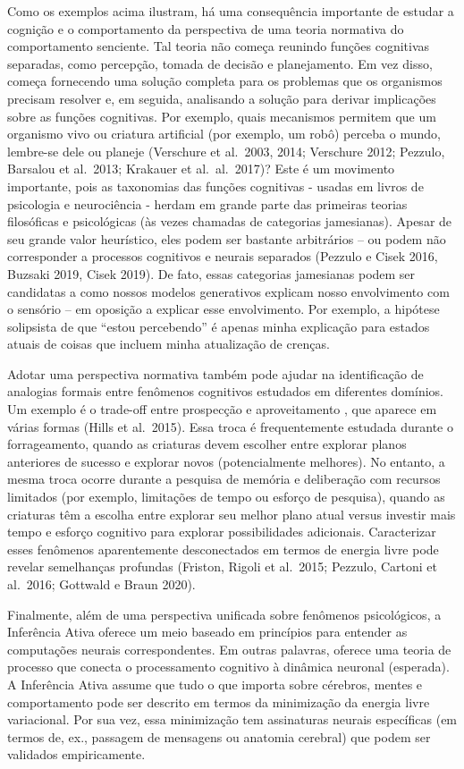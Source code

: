 \documentclass[
  12pt,
]{book}
\begin{document}
Como os exemplos acima ilustram, há uma consequência importante de estudar a cognição e o comportamento da perspectiva de uma teoria normativa do comportamento senciente. Tal teoria não começa reunindo funções cognitivas separadas, como percepção, tomada de decisão e planejamento. Em vez disso, começa fornecendo uma solução completa para os problemas que os organismos precisam resolver e, em seguida, analisando a solução para derivar implicações sobre as funções cognitivas. Por exemplo, quais mecanismos permitem que um organismo vivo ou criatura artificial (por exemplo, um robô) perceba o mundo, lembre-se dele ou planeje (Verschure et al.~2003, 2014; Verschure 2012; Pezzulo, Barsalou et al.~2013; Krakauer et al.~al.~2017)? Este é um movimento importante, pois as taxonomias das funções cognitivas - usadas em livros de psicologia e neurociência - herdam em grande parte das primeiras teorias filosóficas e psicológicas (às vezes chamadas de categorias jamesianas). Apesar de seu grande valor heurístico, eles podem ser bastante arbitrários -- ou podem não corresponder a processos cognitivos e neurais separados (Pezzulo e Cisek 2016, Buzsaki 2019, Cisek 2019). De fato, essas categorias jamesianas podem ser candidatas a como nossos modelos generativos explicam nosso envolvimento com o sensório -- em oposição a explicar esse envolvimento. Por exemplo, a hipótese solipsista de que ``estou percebendo'' é apenas minha explicação para estados atuais de coisas que incluem minha atualização de crenças.

Adotar uma perspectiva normativa também pode ajudar na identificação de analogias formais entre fenômenos cognitivos estudados em diferentes domínios. Um exemplo é o trade-off entre prospecção e aproveitamento , que aparece em várias formas (Hills et al.~2015). Essa troca é frequentemente estudada durante o forrageamento, quando as criaturas devem escolher entre explorar planos anteriores de sucesso e explorar novos (potencialmente melhores). No entanto, a mesma troca ocorre durante a pesquisa de memória e deliberação com recursos limitados (por exemplo, limitações de tempo ou esforço de pesquisa), quando as criaturas têm a escolha entre explorar seu melhor plano atual versus investir mais tempo e esforço cognitivo para explorar possibilidades adicionais. Caracterizar esses fenômenos aparentemente desconectados em termos de energia livre pode revelar semelhanças profundas (Friston, Rigoli et al.~2015; Pezzulo, Cartoni et al.~2016; Gottwald e Braun 2020).

Finalmente, além de uma perspectiva unificada sobre fenômenos psicológicos, a Inferência Ativa oferece um meio baseado em princípios para entender as computações neurais correspondentes. Em outras palavras, oferece uma teoria de processo que conecta o processamento cognitivo à dinâmica neuronal (esperada). A Inferência Ativa assume que tudo o que importa sobre cérebros, mentes e comportamento pode ser descrito em termos da minimização da energia livre variacional. Por sua vez, essa minimização tem assinaturas neurais específicas (em termos de,
ex., passagem de mensagens ou anatomia cerebral) que podem ser validados empiricamente.
\end{document}
